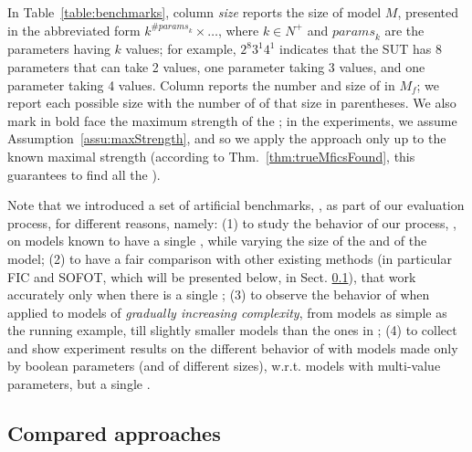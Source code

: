 \begin{tikzborder}{\cite{Gargantini16:validation}}
\begin{tikzborder}{\cite{gargantini_combinatorial_2017}}
\begin{tikzborder}{\cite{gargantini_combinatorial_2017}}
\begin{tikzborder}{\cite{garn2019}}
\begin{tikzborder}{\cite{arcaini2019achieving}}
\begin{tikzborder}{}
In Table~\ref{table:benchmarks}, column \textit{size} reports the size of model $M$, presented in the abbreviated form $k^{\# \mathit{params}_k} \times \ldots$, where $k$$\in$$N^+$ and $\mathit{params}_k$ are the parameters having $k$ values; for example, $2^8$$3^1$$4^1$ indicates that the SUT has 8 parameters that can take 2 values, one parameter taking 3 values, and one parameter taking 4 values. Column \trueMficsSet reports the number and size of \truemfics in $M_f$; we report each possible size with the number of \mfics of that size in parentheses. We also mark in bold face the maximum strength of the \truemfic; in the experiments, we assume Assumption~\ref{assu:maxStrength}, and so we apply the approach only up to the known maximal strength (according to Thm.~\ref{thm:trueMficsFound}, this guarantees to find all the \mfics).
\end{tikzborder}

Note that we introduced a set of artificial benchmarks, \benchArt, as part of our evaluation process, for different reasons, namely: (1) to study the behavior of our process, \mix, on models known to have a single \truemfic, while varying the size of the \truemfic and of the model; (2) to have a fair comparison with other existing methods (in particular FIC and SOFOT, which will be presented below, in Sect. \ref{sec:processes}), that work accurately only when there is a single \mfic; (3) to observe the behavior of \mix when applied to models of \textit{gradually increasing complexity}, from models as simple as the running example, till slightly smaller models than the ones in \benchReal; (4) to collect and show experiment results on the different behavior of \mix with models made only by boolean parameters (and \truemfic of different sizes), w.r.t. models with multi-value parameters, but a single \truemfic. 

\subsection{Compared approaches}\label{sec:processes}


\end{tikzborder}
\end{tikzborder}
\end{tikzborder}
\end{tikzborder}
\end{tikzborder}
